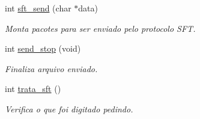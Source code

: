 \begin{DoxyCompactItemize}
int \hyperlink{group__tools_ga646bc80af309b73ef8ec75af642823da}{sft\_\-send} (char $\ast$data)
\begin{DoxyCompactList}\small\item\em Monta pacotes para ser enviado pelo protocolo SFT. \item\end{DoxyCompactList}\item 
int \hyperlink{group__tools_gaa659288168d650321cd44c9b2c58fab1}{send\_\-stop} (void)
\begin{DoxyCompactList}\small\item\em Finaliza arquivo enviado. \item\end{DoxyCompactList}\item 
int \hyperlink{group__tools_ga87766379c1067492aa58573ab7103a55}{trata\_\-sft} ()
\begin{DoxyCompactList}\small\item\em Verifica o que foi digitado pedindo. \item\end{DoxyCompactList}\end{DoxyCompactItemize}
